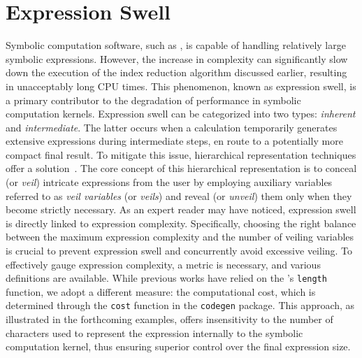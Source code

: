 
\section{Expression Swell}
\label{chap6:sec:expression_swell}

Symbolic computation software, such as \Maple{}, is capable of handling relatively large symbolic expressions. However, the increase in complexity can significantly slow down the execution of the index reduction algorithm discussed earlier, resulting in unacceptably long CPU times. This phenomenon, known as expression swell, is a primary contributor to the degradation of performance in symbolic computation kernels. Expression swell can be categorized into two types: \emph{inherent} and \emph{intermediate}. The latter occurs when a calculation temporarily generates extensive expressions during intermediate steps, en route to a potentially more compact final result. To mitigate this issue, hierarchical representation techniques offer a solution~\cite{zhou2006hierarchical}. The core concept of this hierarchical representation is to conceal (or \emph{veil}) intricate expressions from the user by employing auxiliary variables referred to as \emph{veil variables} (or \emph{veils}) and reveal (or \emph{unveil}) them only when they become strictly necessary. As an expert reader may have noticed, expression swell is directly linked to expression complexity. Specifically, choosing the right balance between the maximum expression complexity and the number of veiling variables is crucial to prevent expression swell and concurrently avoid excessive veiling. To effectively gauge expression complexity, a metric is necessary, and various definitions are available. While previous works have relied on the \Maple{}'s \texttt{length} function, we adopt a different measure: the computational cost, which is determined through the \texttt{cost} function in the \texttt{codegen} package. This approach, as illustrated in the forthcoming examples, offers insensitivity to the number of characters used to represent the expression internally to the symbolic computation kernel, thus ensuring superior control over the final expression size.

